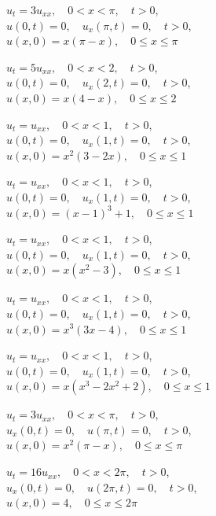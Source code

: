 \begin{exerciselist}
  \item\label{exer:12.1.26} \Cex $u_{t}=3u_{xx},\quad0<x<\pi,\quad t>0$,\\ $u(0,t)=0,\quad u_{x}(\pi,t)=0,\quad t>0$,\\ $u(x,0)=x(\pi-x),\quad0\le x\le\pi$

  \item\label{exer:12.1.27} $u_{t}=5u_{xx},\quad0<x<2,\quad t>0$,\\ $u(0,t)=0,\quad u_{x}(2,t)=0,\quad t>0$,\\ $u(x,0)=x(4-x),\quad0\le x\le2$

  \item\label{exer:12.1.28} $u_{t}=u_{xx},\quad0<x<1,\quad t>0$,\\ $u(0,t)=0,\quad u_{x}(1,t)=0,\quad t>0$,\\ $u(x,0)=x^{2}(3-2x),\quad0\le x\le1$

  \item\label{exer:12.1.29} $u_{t}=u_{xx},\quad0<x<1,\quad t>0$,\\ $u(0,t)=0,\quad u_{x}(1,t)=0,\quad t>0$,\\ $u(x,0)=(x-1)^{3}+1,\quad0\le x\le1$

  \item\label{exer:12.1.30} \Cex $u_{t}=u_{xx},\quad0<x<1,\quad t>0$,\\ $u(0,t)=0,\quad u_{x}(1,t)=0,\quad t>0$,\\ $u(x,0)=x(x^{2}-3),\quad0\le x\le1$

  \item\label{exer:12.1.31} $u_{t}=u_{xx},\quad0<x<1,\quad t>0$,\\ $u(0,t)=0,\quad u_{x}(1,t)=0,\quad t>0$,\\ $u(x,0)=x^{3}(3x-4),\quad0\le x\le1$

  \item\label{exer:12.1.32} $u_{t}=u_{xx},\quad0<x<1,\quad t>0$,\\ $u(0,t)=0,\quad u_{x}(1,t)=0,\quad t>0$,\\ $u(x,0)=x(x^{3}-2x^{2}+2),\quad0\le x\le1$

  \item\label{exer:12.1.33} $u_{t}=3u_{xx},\quad0<x<\pi,\quad t>0$,\\ $u_{x}(0,t)=0,\quad u(\pi,t)=0,\quad t>0$,\\ $u(x,0)=x^{2}(\pi-x),\quad0\le x\le\pi$

  \item\label{exer:12.1.34} $u_{t}=16u_{xx},\quad0<x<2\pi,\quad t>0$,\\ $u_{x}(0,t)=0,\quad u(2\pi,t)=0,\quad t>0$,\\ $u(x,0)=4,\quad0\le x\le2\pi$


\end{exerciselist}
